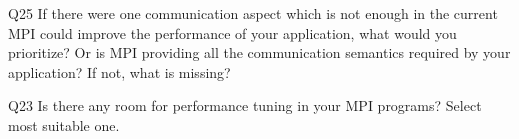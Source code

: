 \begin{description}%
\item{Q25} If there were one communication aspect which is not enough in the current MPI could improve the performance of your application, what would you prioritize? Or is MPI providing all the communication semantics required by your application? If not, what is missing?%
\item{Q23} Is there any room for performance tuning in your MPI programs? Select most suitable one.%
\end{description}%
